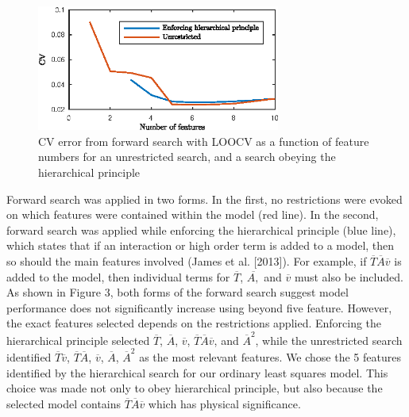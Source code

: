 \documentclass[twocolumn]{article}
\begin{document}
\begin{figure}
\centering
 \includegraphics[width=80mm]{featureSelection}
 \caption{CV error from forward search with LOOCV as a function of feature numbers for an unrestricted search, and a search obeying the hierarchical principle}
 \label{fig:CVerror}
  \end{figure}
 
 Forward search was applied in two forms. In the first, no restrictions were evoked on which features were contained within the model (red line). In the second, forward search was applied while enforcing the hierarchical principle (blue line), which states that if an interaction or high order term is added to a model, then so should the main features involved (James et al. [2013]). For example, if $\overline{T} \overline{A} \overline{v}$ is added to the model, then individual terms for $\overline{T}$, $\overline{A,}$ and $\overline{v}$ must also be included. As shown in Figure 3, both forms of the forward search suggest model performance does not significantly increase using beyond five feature. However, the exact features selected depends on the restrictions applied. Enforcing the hierarchical principle selected $\overline{T}$, $\overline{A}$, $\overline{v}$, $\overline{T} \overline{A} \overline{v}$, and $\overline{A}^{2}$, while the unrestricted search identified $\overline{T} \overline{v}$,  $\overline{T} \overline{A}$, $\overline{v}$, $\overline{A}$, $\overline{A}^{2}$ as the most relevant features. We chose the 5 features identified by the hierarchical search for our ordinary least squares model. This choice was made not only to obey hierarchical principle, but also because the selected model contains $\overline{T} \overline{A} \overline{v}$ which has physical significance. 
\end{document}
